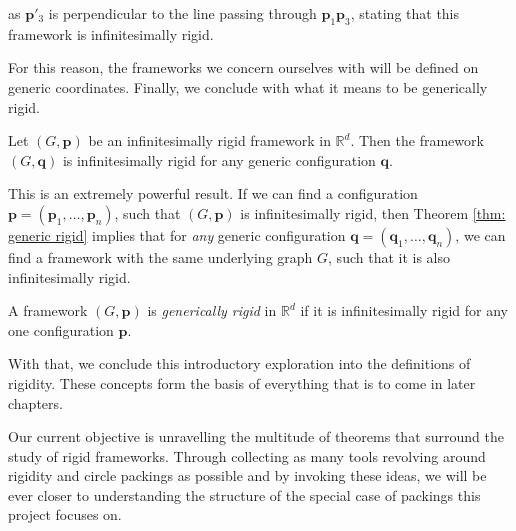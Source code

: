 \begin{flushleft}
as $\mathbf{p}'_3$ is perpendicular to the line passing through $\mathbf{p}_1\mathbf{p}_3$, stating that this framework is infinitesimally rigid. 
\end{flushleft}

\begin{flushleft}
For this reason, the frameworks we concern ourselves with will be defined on generic coordinates. Finally, we conclude with what it means to be generically rigid.    
\end{flushleft}

\begin{theorem}
\label{thm: generic rigid}
\cite{textbook} Let $(G,\mathbf{p})$ be an infinitesimally rigid framework in $\mathbb{R}^d$. Then the framework $(G,\mathbf{q})$ is infinitesimally rigid for any generic configuration $\mathbf{q}$.
\end{theorem}

\begin{flushleft}
This is an extremely powerful result. If we can find a configuration $\mathbf{p} = (\textbf{p}_1, \hdots, \textbf{p}_n)$, such that $(G,\mathbf{p})$ is infinitesimally rigid, then Theorem \ref{thm: generic rigid} implies that for \textit{any} generic configuration $\mathbf{q} = (\textbf{q}_1, \hdots, \textbf{q}_n)$, we can find a framework with the same underlying graph $G$, such that it is also infinitesimally rigid.
\end{flushleft}

\begin{definition}
A framework $(G,\mathbf{p})$ is \textit{generically rigid} in $\mathbb{R}^d$ if it is infinitesimally rigid for any one configuration $\mathbf{p}$.
\end{definition}

\begin{flushleft}
With that, we conclude this introductory exploration into the definitions of rigidity. These concepts form the basis of everything that is to come in later chapters. 
\end{flushleft}

\begin{flushleft}
Our current objective is unravelling the multitude of theorems that surround the study of rigid frameworks. Through collecting as many tools revolving around rigidity and circle packings as possible and by invoking these ideas, we will be ever closer to understanding the structure of the special case of packings this project focuses on.
\end{flushleft}